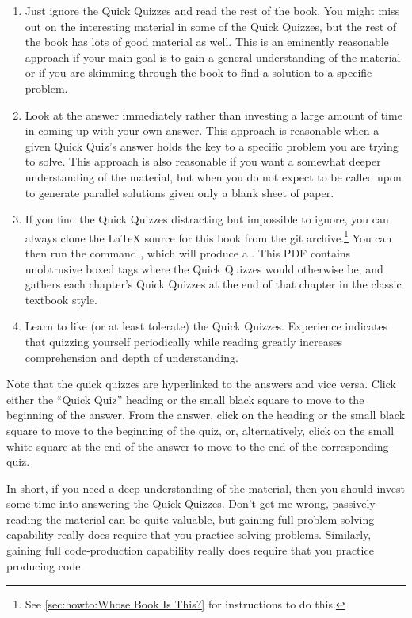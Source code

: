 {{\begin{enumerate}
\item	Just ignore the Quick Quizzes and read the rest of
	the book.
	You might miss out on the interesting material in
	some of the Quick Quizzes, but the rest of the book
	has lots of good material as well.
	This is an eminently reasonable approach if your main
	goal is to gain a general understanding of the material
	or if you are skimming through the book to find a
	solution to a specific problem.
\item	Look at the answer immediately rather than investing
	a large amount of time in coming up with your own
	answer.
	This approach is reasonable when a given Quick Quiz's
	answer holds the key to a specific problem you are
	trying to solve.
	This approach is also reasonable if you want a somewhat
	deeper understanding of the material, but when you do not
	expect to be called upon to generate parallel solutions given
	only a blank sheet of paper.
\item	If you find the Quick Quizzes distracting but impossible
	to ignore, you can always clone the \LaTeX{} source for
	this book from the git archive.\footnote{
		See \cref{sec:howto:Whose Book Is This?}
		for instructions to do this.}
	You can then run the command , which will
	produce a .
	This PDF contains unobtrusive boxed tags where the Quick Quizzes
	would otherwise be, and gathers each chapter's Quick Quizzes
	at the end of that chapter in the classic textbook style.
\item	Learn to like (or at least tolerate) the Quick Quizzes.
	Experience indicates that quizzing yourself periodically
	while reading greatly increases comprehension and depth
	of understanding.
\end{enumerate}

Note that the quick quizzes are hyperlinked to the answers and vice versa.
Click either the ``Quick Quiz'' heading or the small black square
to move to the beginning of the answer.
From the answer, click on the heading or the small black square to
move to the beginning of the quiz, or, alternatively, click on the
small white square at the end of the answer to move to the end of the
corresponding quiz.
}\QuickQuizEndE
}

In short, if you need a deep
understanding of the material, then you should invest some time
into answering the Quick Quizzes.
Don't get me wrong, passively reading the material can be quite
valuable, but gaining full problem-solving capability really
does require that you practice solving problems.
Similarly, gaining full code-production capability really does
require that you practice producing code.

